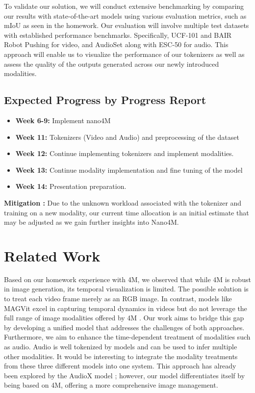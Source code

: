 \documentclass[10pt,conference,compsocconf]{IEEEtran}
\begin{document}
To validate our solution, we will conduct extensive benchmarking by comparing our results with state-of-the-art models using various evaluation metrics, such as mIoU as seen in the homework. Our evaluation will involve multiple test datasets with established performance benchmarks. Specifically, UCF-101 and BAIR Robot Pushing for video, and AudioSet along with ESC-50 for audio. This approach will enable us to visualize the performance of our tokenizers as well as assess the quality of the outputs generated across our newly introduced modalities.


\subsection{Expected Progress by Progress Report}
\begin{itemize}
    \item \textbf{Week 6-9:} Implement nano4M
    \item \textbf{Week 11:} Tokenizers (Video and Audio) and preprocessing of the dataset
    \item \textbf{Week 12:} Continue implementing tokenizers and implement modalities.
    \item \textbf{Week 13:} Continue modality implementation and fine tuning of the model
    \item \textbf{Week 14:} Presentation preparation.
\end{itemize}
    \textbf{Mitigation :} Due to the unknown workload associated with the tokenizer and training on a new modality, our current time allocation is an initial estimate that may be adjusted as we gain further insights into Nano4M.


\section{Related Work}
Based on our homework experience with 4M, we observed that while 4M is robust in image generation, its temporal visualization is limited. The possible solution is to treat each video frame merely as an RGB image. In contrast, models like MAGVit \cite{yu_magvit_2023} excel in capturing temporal dynamics in videos but do not leverage the full range of image modalities offered by 4M \cite{mizrahi_4m_2023}. Our work aims to bridge this gap by developing a unified model that addresses the challenges of both approaches. Furthermore, we aim to enhance the time-dependent treatment of modalities such as audio. Audio is well tokenized by models and can be used to infer multiple other modalities\cite{tian_audiox_2025}. It would be interesting to integrate the modality treatments from these three different models into one system. This approach has already been explored by the AudioX model \cite{tian_audiox_2025}; however, our model differentiates itself by being based on 4M, offering a more comprehensive image management.
\end{document}
